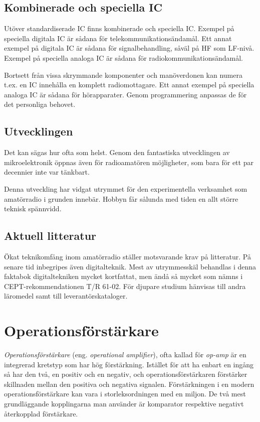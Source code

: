 \subsection{Kombinerade och speciella IC}

Utöver standardiserade IC finns kombinerade och speciella IC.
Exempel på speciella digitala IC är sådana för telekommunikationsändamål.
Ett annat exempel på digitala IC är sådana för signalbehandling, såväl på HF som
LF-nivå.
Exempel på speciella analoga IC är sådana för radiokommunikationsändamål.

Bortsett från vissa skrymmande komponenter och manöverdonen kan numera t.ex. en
IC innehålla en komplett radiomottagare. Ett annat exempel på speciella analoga
IC är sådana för hörapparater. Genom programmering anpassas de för det
personliga behovet.

\subsection{Utvecklingen}

Det kan sägas hur ofta som helst. Genom den fantastiska utvecklingen av
mikroelektronik öppnas även för radioamatören möjligheter, som bara för ett par
decennier inte var tänkbart.

Denna utveckling har vidgat utrymmet för den experimentella verksamhet som
amatörradio i grunden innebär. Hobbyn får sålunda med tiden en allt större
teknisk spännvidd.

\subsection{Aktuell litteratur}

Ökat teknikomfång inom amatörradio ställer motsvarande krav på litteratur. På
senare tid inbegripes även digitalteknik. Mest av utrymmesskäl behandlas i denna
faktabok digitaltekniken mycket kortfattat, men ändå så mycket som nämns i
CEPT-rekommendationen T/R 61-02. För djupare studium hänvisas till andra
läromedel samt till leverantörskataloger.

\section{Operationsförstärkare}

\emph{Operationsförstärkare} (eng. \emph{operational amplifier}), ofta kallad
för \emph{op-amp} är en integrerad kretstyp som har hög förstärkning.
Istället för att ha enbart en ingång så har den två, en positiv
och en negativ, och operationsförstärkaren förstärker skillnaden mellan den
positiva och negativa signalen. Förstärkningen i en modern operationsförstärkare
kan vara i storleksordningen med en miljon.
De två mest grundläggande kopplingarna man använder är komparator respektive
negativt återkopplad förstärkare.

